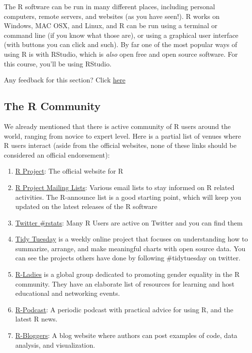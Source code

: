 \documentclass[
]{article}
\providecommand{\tightlist}{%
  \setlength{\itemsep}{0pt}\setlength{\parskip}{0pt}}
\newenvironment{feedback}{
  \specialblock{feedback}{chat-1-fill.png}{Feedback}
}{\endspecialblock}
\begin{document}
The R software can be run in many different places, including personal computers, remote servers, and websites (as you have seen!).
R works on Windows, MAC OSX, and Linux, and
R can be run using a terminal or command line (if you know what those are), or using a graphical user interface (with buttons you can click and such).
By far one of the most popular ways of using R is with RStudio, which is \emph{also} open free and open source software.
For this course, you'll be using RStudio.

\begin{feedback}
Any feedback for this section? Click
\href{https://docs.google.com/forms/d/e/1FAIpQLSePQZ3lIaCIPo9J2owXImHZ_9wBEgTo21A0s-A1ty28u4yfvw/viewform?entry.1684471501=What\%20Is\%20R}{here}
\end{feedback}

\hypertarget{the-r-community}{%
\subsection{The R Community}\label{the-r-community}}

We already mentioned that there is active community of R users around the world, ranging from novice to expert level.
Here is a partial list of venues where R users interact (aside from the official websites, none of these links should be considered an official endorsement):

\begin{enumerate}
\def\labelenumi{\arabic{enumi}.}
\tightlist
\item
  \href{r-project.org}{R Project}: The official website for R
\item
  \href{https://www.r-project.org/mail.html}{R Project Mailing Lists}: Various email lists to stay informed on R related activities. The R-announce list is a good starting point, which will keep you updated on the latest releases of the R software
\item
  \href{https://twitter.com/hashtag/rstats?lang=en}{Twitter \#rstats}: Many R Users are active on Twitter and you can find them
\item
  \href{https://github.com/rfordatascience/tidytuesday}{Tidy Tuesday} is a weekly online project that focuses on understanding how to summarize, arrange, and make meaningful charts with open source data. You can see the projects others have done by following \#tidytuesday on twitter.
\item
  \href{https://rladies.org/}{R-Ladies} is a global group dedicated to promoting gender equality in the R community. They have an elaborate list of resources for learning and host educational and networking events.
\item
  \href{https://r-podcast.org/}{R-Podcast}: A periodic podcast with practical advice for using R, and the latest R news.
\item
  \href{r-bloggers.com}{R-Bloggers}: A blog website where authors can post examples of code, data analysis, and visualization.
\end{enumerate}
\end{document}

